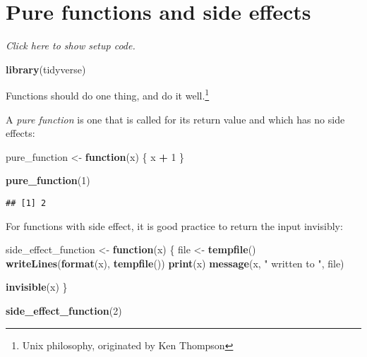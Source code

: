 \documentclass[]{book}
\newenvironment{Shaded}{\begin{snugshade}}{\end{snugshade}}
\newcommand{\ControlFlowTok}[1]{\textcolor[rgb]{0.13,0.29,0.53}{\textbf{#1}}}
\newcommand{\DecValTok}[1]{\textcolor[rgb]{0.00,0.00,0.81}{#1}}
\newcommand{\KeywordTok}[1]{\textcolor[rgb]{0.13,0.29,0.53}{\textbf{#1}}}
\newcommand{\NormalTok}[1]{#1}
\newcommand{\OperatorTok}[1]{\textcolor[rgb]{0.81,0.36,0.00}{\textbf{#1}}}
\newcommand{\StringTok}[1]{\textcolor[rgb]{0.31,0.60,0.02}{#1}}
\let\rmarkdownfootnote\footnote%
\def\footnote{\protect\rmarkdownfootnote}
\begin{document}
\hypertarget{pure-functions-and-side-effects}{%
\section{Pure functions and side effects}\label{pure-functions-and-side-effects}}

\emph{Click here to show setup code.}

\begin{Shaded}
\begin{Highlighting}[]
\KeywordTok{library}\NormalTok{(tidyverse)}
\end{Highlighting}
\end{Shaded}

Functions should do one thing, and do it well.\footnote{Unix philosophy, originated by Ken Thompson}

A \emph{pure function} is one that is called for its return value and which has no side effects:

\begin{Shaded}
\begin{Highlighting}[]
\NormalTok{pure_function <-}\StringTok{ }\ControlFlowTok{function}\NormalTok{(x) \{}
\NormalTok{  x }\OperatorTok{+}\StringTok{ }\DecValTok{1}
\NormalTok{\}}

\KeywordTok{pure_function}\NormalTok{(}\DecValTok{1}\NormalTok{)}
\end{Highlighting}
\end{Shaded}

\begin{verbatim}
## [1] 2
\end{verbatim}

For functions with side effect, it is good practice to return the input invisibly:

\begin{Shaded}
\begin{Highlighting}[]
\NormalTok{side_effect_function <-}\StringTok{ }\ControlFlowTok{function}\NormalTok{(x) \{}
\NormalTok{  file <-}\StringTok{ }\KeywordTok{tempfile}\NormalTok{()}
  \KeywordTok{writeLines}\NormalTok{(}\KeywordTok{format}\NormalTok{(x), }\KeywordTok{tempfile}\NormalTok{())}
  \KeywordTok{print}\NormalTok{(x)}
  \KeywordTok{message}\NormalTok{(x, }\StringTok{" written to "}\NormalTok{, file)}

  \KeywordTok{invisible}\NormalTok{(x)}
\NormalTok{\}}

\KeywordTok{side_effect_function}\NormalTok{(}\DecValTok{2}\NormalTok{)}
\end{Highlighting}
\end{Shaded}
\end{document}

